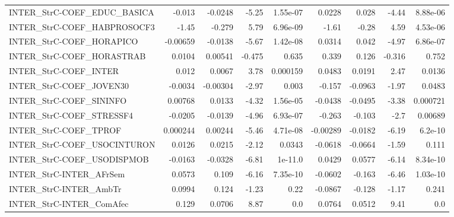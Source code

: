 \begin{tabular}{lrrrrrrrr}
INTER\_StrC-COEF\_EDUC\_BASICA            &      -0.013 &      -0.0248 &    -5.25 & 1.55e-07 &     0.0228 &       0.028 &        -4.44 &      8.88e-06 \\
INTER\_StrC-COEF\_HABPROSOCF3            &       -1.45 &       -0.279 &     5.79 & 6.96e-09 &      -1.61 &       -0.28 &         4.59 &      4.53e-06 \\
INTER\_StrC-COEF\_HORAPICO               &    -0.00659 &      -0.0138 &    -5.67 & 1.42e-08 &     0.0314 &       0.042 &        -4.97 &      6.86e-07 \\
INTER\_StrC-COEF\_HORASTRAB              &      0.0104 &      0.00541 &   -0.475 &    0.635 &      0.339 &       0.126 &       -0.316 &         0.752 \\
INTER\_StrC-COEF\_INTER                  &       0.012 &       0.0067 &     3.78 & 0.000159 &     0.0483 &      0.0191 &         2.47 &        0.0136 \\
INTER\_StrC-COEF\_JOVEN30                &     -0.0034 &     -0.00304 &    -2.97 &    0.003 &     -0.157 &     -0.0963 &        -1.97 &        0.0483 \\
INTER\_StrC-COEF\_SININFO                &     0.00768 &       0.0133 &    -4.32 & 1.56e-05 &    -0.0438 &     -0.0495 &        -3.38 &      0.000721 \\
INTER\_StrC-COEF\_STRESSF4               &     -0.0205 &      -0.0139 &    -4.96 & 6.93e-07 &     -0.263 &      -0.103 &         -2.7 &       0.00689 \\
INTER\_StrC-COEF\_TPROF                  &    0.000244 &      0.00244 &    -5.46 & 4.71e-08 &   -0.00289 &     -0.0182 &        -6.19 &       6.2e-10 \\
INTER\_StrC-COEF\_USOCINTURON            &      0.0126 &       0.0215 &    -2.12 &   0.0343 &    -0.0618 &     -0.0664 &        -1.59 &         0.111 \\
INTER\_StrC-COEF\_USODISPMOB             &     -0.0163 &      -0.0328 &    -6.81 &  1e-11.0 &     0.0429 &      0.0577 &        -6.14 &      8.34e-10 \\
INTER\_StrC-INTER\_AFrSem                &      0.0573 &        0.109 &    -6.16 & 7.35e-10 &    -0.0602 &      -0.163 &        -6.46 &      1.03e-10 \\
INTER\_StrC-INTER\_AmbTr                 &      0.0994 &        0.124 &    -1.23 &     0.22 &    -0.0867 &      -0.128 &        -1.17 &         0.241 \\
INTER\_StrC-INTER\_ComAfec               &       0.129 &       0.0706 &     8.87 &      0.0 &     0.0764 &      0.0512 &         9.41 &           0.0 \\

\end{tabular}
